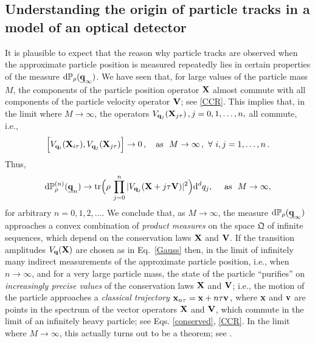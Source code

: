 \documentclass[12pt]{article}
\renewcommand{\d}{{\mathrm d}}
\begin{document}
 \subsection{Understanding the origin of particle tracks in a model of an optical detector}
 It is plausible to expect that the reason why particle tracks are observed when the approximate particle position is measured repeatedly lies in certain properties of the measure $\d\mathbb{P}_{\rho}(\underline{{\bf{q}}}_{\infty})$. We have seen that, for large values of the particle mass $M$, the components of the particle position operator ${\bf{X}}$ almost commute with all components of the particle velocity operator ${\bf{V}}$; see \eqref{CCR}. This implies that, in the limit where $M \rightarrow \infty$, the operators 
 $V_{{\bf{q}}_{j}}({\bf{X}}_{j \tau})\,, j= 0,1,\dots, n,$ all commute, i.e.,
 \begin{equation}\label{class lim}
 \Big[V_{{\bf{q}}_{i}}({\bf{X}}_{i \tau}), V_{{\bf{q}}_{j}}({\bf{X}}_{j \tau}) \Big] \rightarrow 0\,, \quad \text{as   }\,\, M\rightarrow \infty\,, \,\, \forall \,\, i,j=1,\dots, n\,.
 \end{equation}
 Thus,
 \begin{equation}\label{lim measure}
 \d\mathbb{P}^{(n)}_{\rho}(\underline{{\bf{q}}}_{n}) \rightarrow \text{tr}\Big( \rho\,\prod_{j=0}^{n} \vert V_{{\bf{q}}_j}({\bf{X}}+j\tau {\bf{V}}) \vert^{2}\Big) \d^{d} q_{j}, \quad \text{ as  }\,\, M\rightarrow \infty,
 \end{equation}
for arbitrary $n=0,1,2,\dots$. We conclude that, as $M\rightarrow \infty$, the measure 
$\d \mathbb{P}_{\rho}(\underline{{\bf{q}}}_{\infty})$ approaches a convex combination of
 \textit{product measures} on the space $\mathfrak{Q}$ of infinite sequences, which
depend on the conservation laws ${\bf{X}}$ and ${\bf{V}}$.
If the transition amplitudes $V_{{\bf{q}}}({\bf{X}})$ are chosen as in Eq.~\eqref{Gauss} then, in the limit of infinitely many indirect measurements of the approximate particle position, i.e., when $n \rightarrow \infty$, 
and for a very large particle mass, the 
state of the particle ``purifies'' on \textit{increasingly precise values} of the conservation laws ${\bf{X}}$ and $
{\bf{V}}$; i.e., the motion of the particle approaches a \textit{classical trajectory}
${\bf{x}}_{n\tau} = {\bf{x}} + n\tau {\bf{v}}\,,$ where ${\bf{x}}$ and ${\bf{v}}$ are points in the spectrum of the vector 
operators ${\bf{X}}$ and ${\bf{V}}$, which commute in the limit of an infinitely heavy particle; see Eqs. \eqref{conserved}, \eqref{CCR}. In the limit where $M \rightarrow \infty$, this actually turns out to be a theorem; see \cite{BBB, BCFFS}. 
 
\end{document}
